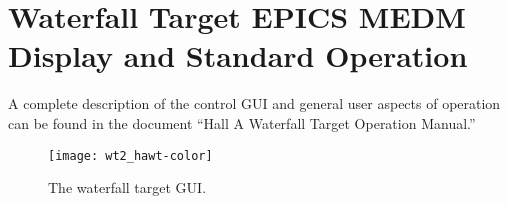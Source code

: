 \section{Waterfall Target EPICS MEDM Display and Standard Operation\label{sec: MEDM-operation}}

A complete description of the control GUI and general user aspects
of operation can be found in the document {}``Hall A Waterfall Target
Operation Manual.''

%
\begin{figure}
\begin{center}\texttt{[image: wt2\_hawt-color]}\end{center}


\caption{The waterfall target GUI.}

\label{fig:wt_mvmotor}
\end{figure}


